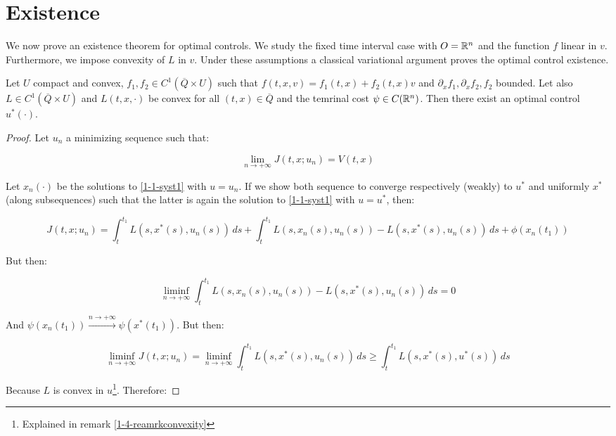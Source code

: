 \section{Existence}

We now prove an existence theorem for optimal controls.
We study the fixed time interval case with $O=\mathbb{R}^n$ and the function $f$ linear in $v$.
Furthermore, we impose convexity of $L$ in $v$. Under these assumptions a classical variational
argument proves the optimal control existence.
\begin{theorem}
    Let $U$ compact and convex, $f_1,f_2\in C^1(\overline{Q}\times U)$ such that $f(t,x,v)=f_1(t,x)+f_2(t,x)v$ and $\partial_xf_{1},\partial_xf_2,f_2$ bounded.
    Let also $L\in C^1(\overline{Q}\times U)$ and $L(t,x,\cdot)$ be convex for all $(t,x)\in\overline{Q}$ and the temrinal cost $\psi\in C(\mathbb{R}^n)$. Then there exist an optimal control $u^{\ast}(\cdot)$.

    \begin{proof}
        Let $u_n$ a minimizing sequence such that:

        \begin{equation}
            \lim_{n\to+\infty} J(t,x;u_n) = V(t,x)
        \end{equation}

        Let $x_n(\cdot)$ be the solutions to \ref{1-1-syst1} with $u=u_n$. If we show both sequence to converge respectively 
        (weakly) to $u^{\ast}$ and uniformly $x^{\ast}$ (along subsequences) such that the latter is again the solution to \ref{1-1-syst1} with $u=u^{\ast}$, then:

        \[J(t,x;u_n) = \int_t^{t_1} L(s,x^{\ast}(s),u_n(s)) \,ds + \int_t^{t_1} L(s,x_n(s),u_n(s)) - L(s,x^{\ast}(s),u_n(s)) \,ds + \phi(x_n(t_1))\]

        But then:

        \[\liminf_{n\to+\infty} \int_t^{t_1} L(s,x_n(s),u_n(s)) - L(s,x^{\ast}(s),u_n(s)) \,ds = 0\]

        And $\psi(x_n(t_1))\xrightarrow{n\to+\infty}\psi(x^{\ast}(t_1))$. But then:

        \begin{equation}\label{1-4-existenceliminf}
            \liminf_{n\to+\infty} J(t,x;u_n) = \liminf_{n\to+\infty} \int_t^{t_1} L(s,x^{\ast}(s),u_n(s)) \,ds \geq \int_t^{t_1} L(s,x^{\ast}(s),u^{\ast}(s)) \,ds 
        \end{equation}

        Because $L$ is convex in $u$\footnote{Explained in remark \ref{1-4-reamrkconvexity}}. Therefore:


\end{proof}
\end{theorem}
